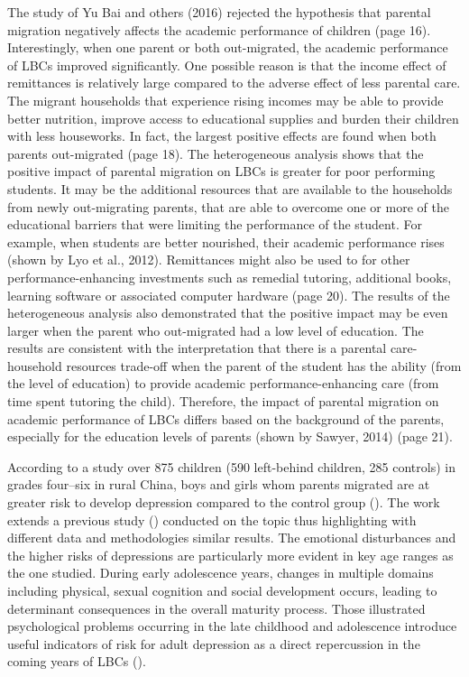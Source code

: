 The study of Yu Bai and others (2016) rejected the hypothesis that parental migration negatively affects the academic performance of children (page 16). Interestingly, when one parent or both out-migrated, the academic performance of LBCs improved significantly. One possible reason is that the income effect of remittances is relatively large compared to the adverse effect of less parental care. The migrant households that experience rising incomes may be able to provide better nutrition, improve access to educational supplies and burden their children with less houseworks. In fact, the largest positive effects are found when both parents out-migrated (page 18). The heterogeneous analysis shows that the positive impact of parental migration on LBCs is greater for poor performing students. It may be the additional resources that are available to the households from newly out-migrating parents, that are able to overcome one or more of the educational barriers that were limiting the performance of the student. For example, when students are better nourished, their academic performance rises (shown by Lyo et al., 2012). Remittances might also be used to for other performance-enhancing investments such as remedial tutoring, additional books, learning software or associated computer hardware (page 20). The results of the heterogeneous analysis also demonstrated that the positive impact may be even larger when the parent who out-migrated had a low level of education. The results are consistent with the interpretation that there is a parental care-household resources trade-off when the parent of the student has the ability (from the level of education) to provide academic performance-enhancing care (from time spent tutoring the child). Therefore, the impact of parental migration on academic performance of LBCs differs based on the background of the parents, especially for the education levels of parents (shown by Sawyer, 2014) (page 21).



According to a study over 875 children (590 left-behind
children, 285 controls) in grades four–six in rural China, boys and girls whom parents migrated are at greater risk to develop depression compared to the control group (\cite{he2012depression}). The work extends a previous study (\cite{fan2010emotional}) conducted on the topic thus highlighting with different data and methodologies similar results. The emotional disturbances and the higher risks of depressions are particularly more evident in key age ranges as the one studied. During early adolescence years, changes in multiple domains including physical, sexual cognition
and social development occurs, leading to determinant consequences in the overall maturity process. Those illustrated psychological problems occurring in the late childhood and adolescence introduce useful indicators of risk for adult depression as a direct repercussion in the coming years of LBCs (\cite{kosterman2010assessment}).


